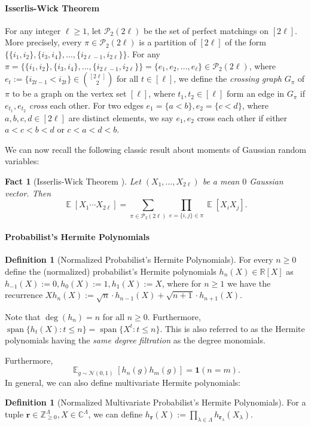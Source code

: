 \documentclass
[11pt,letterpaper]
{article}
\newtheorem{fact}[theorem]{Fact}
\theoremstyle{definition}
\newtheorem{definition}[theorem]{Definition}
\newcommand{\cN}{\mathcal{N}}
\newcommand{\R}{{\mathbb R}}
\newcommand{\1}{\mathbf{1}}
\newcommand{\Z}{\mathbb Z}
\newcommand{\C}{\mathbb C}
\newcommand{\spn}{\operatorname{span}}
\DeclareMathOperator*{\E}{\mathbb{E}}
\renewcommand{\geq}{\geqslant}
\renewcommand{\leq}{\leqslant}
\newcommand{\cP}{\mathcal{P}}
\begin{document}
\paragraph{Isserlis-Wick Theorem} For any integer $\ell\geq 1$, let $\cP_2(2\ell)$ be the set of perfect matchings on $[2\ell]$. More precisely, every $\pi\in\cP_2(2\ell)$ is a partition of $[2\ell]$ of the form $\Big\{\{i_1, i_2\}, \{i_3, i_4\}, \ldots, \{i_{2\ell - 1}, i_{2\ell}\}\Big\}$. For any $\pi = \Big\{\{i_1, i_2\}, \{i_3, i_4\}, \ldots, \{i_{2\ell - 1}, i_{2\ell}\}\Big\} = \Big\{e_1, e_2, \ldots, e_\ell\Big\}\in\cP_2(2\ell)$, where $e_t:= \{i_{2t - 1} < i_{2t}\}\in\binom{[2\ell]}{2}$ for all $t\in[\ell]$, we define the \emph{crossing graph} $G_\pi$ of $\pi$ to be a graph on the vertex set $[\ell]$, where $t_1, t_2\in[\ell]$ form an edge in $G_\pi$ if $e_{t_1}, e_{t_2}$ \emph{cross} each other. For two edges $e_1 = \{a < b\}, e_2 = \{c < d\}$, where $a, b, c, d\in[2\ell]$ are distinct elements, we say $e_1, e_2$ cross each other if either $a < c < b < d$ or $c < a < d < b$.

We can now recall the following classic result about moments of Gaussian random variables:
\begin{fact}[Isserlis-Wick Theorem \cite{Isserlis18,Wick50}]\label{fact:isserlis-wick}
    Let $(X_1, \ldots, X_{2\ell})$ be a mean $0$ Gaussian vector. Then 
    \[\E[X_1\cdots X_{2\ell}] = \sum_{\pi\in\cP_2(2\ell)}\prod_{e = \{i, j\}\in\pi}\E[X_iX_j].\]
\end{fact}

\paragraph{Probabilist's Hermite Polynomials} 

\begin{definition}[Normalized Probabilist's Hermite Polynomials]\label{def:hermite-polynomial}
    For every $n\geq 0$ define the (normalized) probabilist's Hermite polynomials $h_n(X)\in\R[X]$ as $h_{-1}(X):= 0, h_0(X):= 1, h_1(X):= X$, where for $n\geq 1$ we have the recurrence $Xh_{n}(X):= \sqrt{n}\cdot h_{n - 1}(X) + \sqrt{n + 1}\cdot h_{n + 1}(X)$. 
\end{definition}
Note that $\deg(h_n) = n$ for all $n\geq 0$. Furthermore, $\spn\{h_t(X):t\leq n\} = \spn\{X^t:t\leq n\}$. This is also referred to as the Hermite polynomials having the \emph{same degree filtration} as the degree monomials.

Furthermore, 
\[\E_{g\sim\cN(0, 1)}\left[h_n(g)h_m(g)\right] = \1(n = m).\]
In general, we can also define multivariate Hermite polynomials:
\begin{definition}[Normalized Multivariate Probabilist's Hermite Polynomials]\label{def:hermite-polynomial-multivar}
    For a tuple $\bm{r}\in\Z_{\geq 0}^\Lambda, X\in\C^\Lambda$, we can define $h_{\bm{r}}(X):= \prod_{\lambda\in\Lambda}h_{\bm{r}_\lambda}(X_\lambda)$. 
\end{definition}
\end{document}
